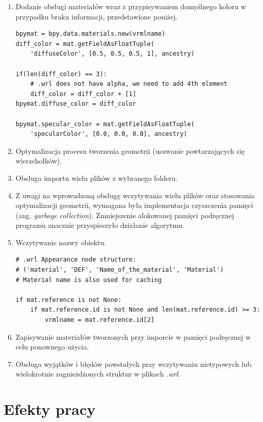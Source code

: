 \documentclass{xmgr}
\begin{document}
\begin{enumerate}
\item Dodanie obsługi materiałów wraz z przypisywaniem domyślnego koloru w przypadku braku informacji, przedstawione poniżej.
\begin{lstlisting}
bpymat = bpy.data.materials.new(vrmlname)
diff_color = mat.getFieldAsFloatTuple(
	'diffuseColor', [0.5, 0.5, 0.5, 1], ancestry)

if(len(diff_color) == 3):
    # .wrl does not have alpha, we need to add 4th element
    diff_color = diff_color + [1]
bpymat.diffuse_color = diff_color

bpymat.specular_color = mat.getFieldAsFloatTuple(
	'specularColor', [0.0, 0.0, 0.0], ancestry)
\end{lstlisting}
\item Optymalizacja procesu tworzenia geometrii (usuwanie powtarzających się wierzchołków).
\item Obsługa importu wielu plików z wybranego folderu.
\item Z uwagi na wprowadzoną obsługę wczytywania wielu plików oraz stosowania optymalizacji geometrii, wymagana była implementacja czyszczenia pamięci (ang. \emph{garbage collection}). Zmniejszenie alokowanej pamięci podręcznej programu znacznie przyspieszyło działanie algorytmu.
\item Wczytywanie nazwy obiektu.
\begin{lstlisting}
# .wrl Appearance node structure:
# ('material', 'DEF', 'Name_of_the_material', 'Material')
# Material name is also used for caching

if mat.reference is not None:
    if mat.reference.id is not None and len(mat.reference.id) >= 3:
        vrmlname = mat.reference.id[2]
\end{lstlisting}
\item Zapisywanie materiałów tworzonych przy imporcie w pamięci podręcznej w celu ponownego użycia.
\item Obsługa wyjątków i błędów powstałych przy wczytywaniu nietypowych lub wielokrotnie zagnieżdżonych struktur w plikach \emph{.wrl}.


\end{enumerate}

\chapter{Efekty pracy}
\end{document}
